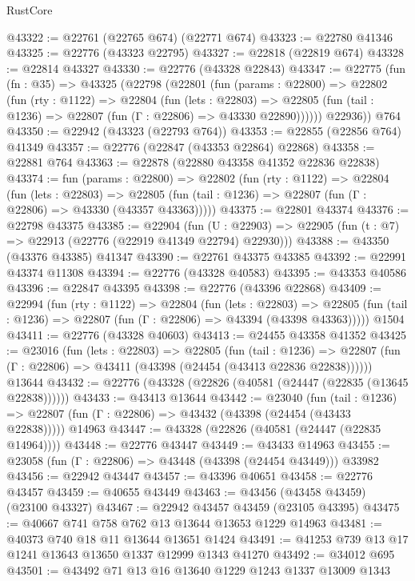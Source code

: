 \begin{lexlean}{RustCore}
\begin{coremodule}
@43322 := @22761 (@22765 @674) (@22771 @674)
@43323 := @22780 @41346
@43325 := @22776 (@43323 @22795)
@43327 := @22818 (@22819 @674)
@43328 := @22814 @43327
@43330 := @22776 (@43328 @22843)
@43347 := @22775
    (fun (fn : @35) =>
    @43325
      (@22798
        (@22801
          (fun (params : @22800) =>
          @22802
            (fun (rty : @1122) =>
            @22804
              (fun (lets : @22803) =>
              @22805 (fun (tail : @1236) => @22807 (fun (Γ : @22806) => @43330 @22890))))))
        @22936))
    @764
@43350 := @22942 (@43323 (@22793 @764))
@43353 := @22855 (@22856 @764) @41349
@43357 := @22776 (@22847 (@43353 @22864) @22868)
@43358 := @22881 @764
@43363 := @22878 (@22880 @43358 @41352 @22836 @22838)
@43374 := fun (params : @22800) =>
  @22802
    (fun (rty : @1122) =>
    @22804
      (fun (lets : @22803) =>
      @22805 (fun (tail : @1236) => @22807 (fun (Γ : @22806) => @43330 (@43357 @43363)))))
@43375 := @22801 @43374
@43376 := @22798 @43375
@43385 := @22904
    (fun (U : @22903) => @22905 (fun (t : @7) => @22913 (@22776 (@22919 @41349 @22794) @22930)))
@43388 := @43350 (@43376 @43385) @41347
@43390 := @22761 @43375 @43385
@43392 := @22991 @43374 @11308
@43394 := @22776 (@43328 @40583)
@43395 := @43353 @40586
@43396 := @22847 @43395
@43398 := @22776 (@43396 @22868)
@43409 := @22994
    (fun (rty : @1122) =>
    @22804
      (fun (lets : @22803) =>
      @22805 (fun (tail : @1236) => @22807 (fun (Γ : @22806) => @43394 (@43398 @43363)))))
    @1504
@43411 := @22776 (@43328 @40603)
@43413 := @24455 @43358 @41352
@43425 := @23016
    (fun (lets : @22803) =>
    @22805
      (fun (tail : @1236) =>
      @22807 (fun (Γ : @22806) => @43411 (@43398 (@24454 (@43413 @22836 @22838))))))
    @13644
@43432 := @22776 (@43328 (@22826 (@40581 (@24447 (@22835 (@13645 @22838))))))
@43433 := @43413 @13644
@43442 := @23040
    (fun (tail : @1236) => @22807 (fun (Γ : @22806) => @43432 (@43398 (@24454 (@43433 @22838)))))
    @14963
@43447 := @43328 (@22826 (@40581 (@24447 (@22835 @14964))))
@43448 := @22776 @43447
@43449 := @43433 @14963
@43455 := @23058 (fun (Γ : @22806) => @43448 (@43398 (@24454 @43449))) @33982
@43456 := @22942 @43447
@43457 := @43396 @40651
@43458 := @22776 @43457
@43459 := @40655 @43449
@43463 := @43456 (@43458 @43459) (@23100 @43327)
@43467 := @22942 @43457 @43459 (@23105 @43395)
@43475 := @40667 @741 @758 @762 @13 @13644 @13653 @1229 @14963
@43481 := @40373 @740 @18 @11 @13644 @13651 @1424
@43491 := @41253 @739 @13 @17 @1241 @13643 @13650 @1337 @12999 @1343 @41270
@43492 := @34012 @695
@43501 := @43492 @71 @13 @16 @13640 @1229 @1243 @1337 @13009 @1343

\end{coremodule}
\end{lexlean}
